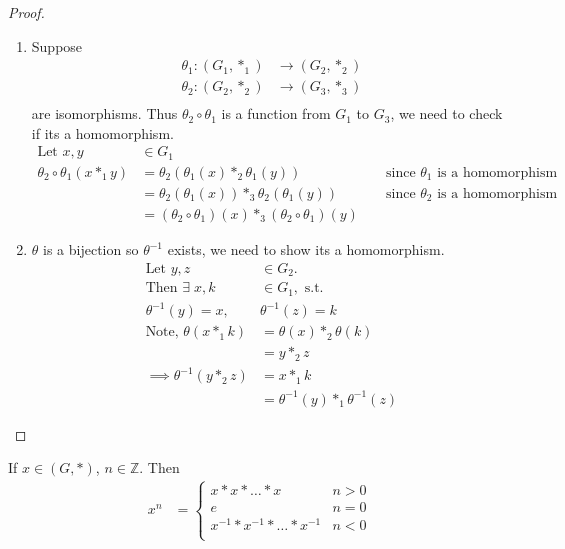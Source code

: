 \begin{proof} \mbox{} 

\begin{enumerate}
\def\labelenumi{\roman{enumi}.}
  \item Suppose
  \begin{align*}
      \theta_1 : (G_1, *_1) &\to (G_2, *_2) \\
      \theta_2 : (G_2, *_2) &\to (G_3, *_3) \\
  \end{align*}
  are isomorphisms.
  Thus \(\theta_2 \circ \theta_1\) is a function from \(G_1\) to \(G_3\), we need to check if its a homomorphism.
  \begin{align*}
      \text{Let } x, y &\in G_1 && \\
      \theta_2 \circ \theta_1 (x *_1 y) &= \theta_2(\theta_1(x) *_2 \theta_1(y)) & &\text{ since $\theta_1$ is a homomorphism} \\
      &= \theta_2(\theta_1(x)) *_3 \theta_2(\theta_1(y)) & &\text{ since $\theta_2$ is a homomorphism} \\
      &= (\theta_2 \circ \theta_1)(x) *_3 (\theta_2 \circ \theta_1)(y) &&
  \end{align*}
  \item
    \(\theta\) is a bijection so \(\theta^{-1}\) exists, we need to show its a homomorphism.
    \begin{align*}
    \text{Let } y, z &\in G_2. \\
    \text{Then } \exists \; x, k &\in G_1, \text{ s.t.} \\
    \theta^{-1}(y) = x,\ &\theta^{-1}(z) = k \\
    \text{Note, } \theta(x *_1 k) &= \theta(x) *_2 \theta(k) \\
    &= y *_2 z \\
    \implies \theta^{-1}(y *_2 z) &= x *_1 k \\
    &= \theta^{-1}(y) *_1 \theta^{-1}(z)
    \end{align*}
\end{enumerate}
\end{proof}

\begin{notation}
If \(x \in (G, *)\), \(n \in \mathbb{Z}\).
Then
\begin{align*}
    x^n &= \begin{cases}
        x * x * \ldots * x & n > 0 \\
        e & n = 0 \\
        x^{-1} * x^{-1} * \ldots * x^{-1} & n < 0 \\
    \end{cases}
\end{align*}
\end{notation}

